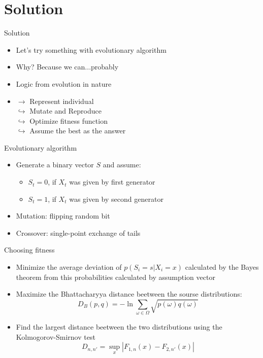 \documentclass[hyperref=unicode,graphics=pdflatex,13pt]{beamer}
\begin{document}
\section{Solution} %
\begin{frame}{Solution}
  \begin{itemize}
   \item Let's try something with evolutionary algorithm
   \item Why? Because we can...probably
   \item Logic from evolution in nature
   \item $\rightarrow$ Represent individual \\ $\hookrightarrow$ Mutate and Reproduce \\
   $\hookrightarrow$ Optimize fitness function  \\ $\hookrightarrow$ Assume the best as the answer
  \end{itemize}

\end{frame}

\begin{frame}{Evolutionary algorithm}
 \begin{itemize}
  \item Generate a binary vector $S$ and assume:
   \begin{itemize}
   \item $S_t = 0$, if $X_t$ was given by first generator
   \item $S_t = 1$, if $X_t$ was given by second generator
   \end{itemize}
  \item Mutation: flipping random bit
  \item Crossover: single-point exchange of tails
 \end{itemize}
\end{frame}

\begin{frame}{Choosing fitness}
\begin{itemize}
   \item Minimize the average deviation of $p(S_i=s | X_i = x)$ calculated by the Bayes theorem from this probabilities calculated by assumption vector
   \item Maximize the Bhattacharyya distance beetween the sourse distributions:
   $$D_B(p, q) = -\ln{\sum_{\omega \in \Omega} \sqrt{p(\omega)q(\omega)}}$$
   \item Find the largest distance beetween the two distributions using the Kolmogorov-Smirnov test
   $$D_{n,n'} = \sup_{x} | F_{1,n}(x) - F_{2,n'}(x)|  $$ 
\end{itemize}




\end{frame}
\end{document}
